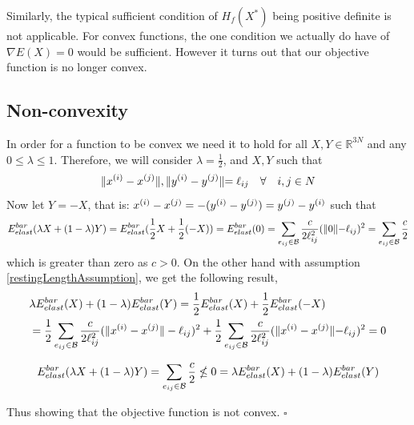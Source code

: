 Similarly, the typical sufficient condition of $H_f(X^*)$ being positive definite is not applicable. For convex functions, the one condition we actually do have of $\nabla E(X)=0$ would be sufficient. However it turns out that our objective function is no longer convex.

\subsection{Non-convexity}
In order for a function to be convex we need it to hold for all $X,Y \in \mathbb{R}^{3N}$ and any $0\leq \lambda \leq 1$. Therefore, we will consider $\lambda = \frac{1}{2}$, and $X,Y$ such that 
\begin{equation}
\label{restingLengthAssumption}
    \rVert x^{(i)}-x^{(j)} \lVert, \rVert y^{(i)}-y^{(j)} \lVert = \ell_{ij} \quad \forall \quad i,j \in N
\end{equation}
Now let $Y = -X$, that is: $x^{(i)}-x^{(j)} = -(y^{(i)}-y^{(j)}) = y^{(j)}-y^{(i)}$ such that
\begin{equation}
\label{energyConv1}
    E^{bar}_{elast}(\lambda X + (1-\lambda) Y) = E^{bar}_{elast}(\frac{1}{2}X + \frac{1}{2}(-X)) 
    = E^{bar}_{elast}(0) = \sum\limits_{e_{ij} \in \mathcal{B}} \frac{c}{2 \ell_{ij}^2} ( \rVert 0 \lVert - \ell_{ij})^2 = \sum\limits_{e_{ij} \in \mathcal{B}}\frac{c}{2}     
\end{equation}
which is greater than zero as $c>0$.
On the other hand with assumption \eqref{restingLengthAssumption}, we get the following result,
\begin{equation}
\label{energyConv2}
\begin{aligned}    
    &\lambda E^{bar}_{elast}(X) + (1-\lambda)E^{bar}_{elast}(Y) = \frac{1}{2}E^{bar}_{elast}(X) + \frac{1}{2}E^{bar}_{elast}(-X) \\&
    = \frac{1}{2}\sum\limits_{e_{ij} \in \mathcal{B}} \frac{c}{2\ell_{ij}^2} (\lVert x^{(i)} - x^{(j)}\rVert - \ell_{ij})^2 + \frac{1}{2} \sum\limits_{e_{ij} \in \mathcal{B}}\frac{c}{2\ell_{ij}^2} (\rVert x^{(i)}-x^{(j)}\lVert-\ell_{ij})^2 = 0
    \end{aligned}
\end{equation}

\begin{equation*}
     E^{bar}_{elast}(\lambda X + (1-\lambda) Y) = \sum\limits_{e_{ij} \in \mathcal{B}}\frac{c}{2}  \nleq 0  = \lambda E^{bar}_{elast}(X) + (1-\lambda)E^{bar}_{elast}(Y)
\end{equation*}

Thus showing that the objective function is not convex. \hfill $\square$

